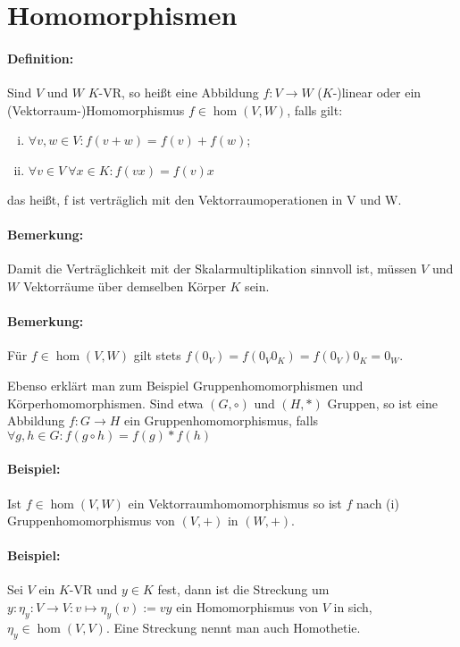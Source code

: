 \section{Homomorphismen}
\paragraph{Definition:}
	Sind $ V $ und $ W $ $ K $-VR, so heißt eine Abbildung $f: V \rightarrow W$ ($ K $-)linear oder ein (Vektorraum-)Homomorphismus $f\in \hom(V,W)$, falls gilt:

\begin{enumerate}[(i)]
	\item $\forall v,w \in V: f(v+w) = f(v) + f(w)$;
	\item $\forall v\in V\ \forall x\in K: f(vx) = f(v)x$
\end{enumerate}

    das heißt, f ist verträglich mit den Vektorraumoperationen in V und W.
    
\paragraph{Bemerkung:}
	Damit die Verträglichkeit mit der Skalarmultiplikation sinnvoll ist, müssen $ V $ und $ W $ Vektorräume über demselben Körper $ K $ sein.

\paragraph{Bemerkung:}
	Für $f\in \hom(V,W)$ gilt stets $f(0_V) = f(0_V0_K) = f(0_V)0_K = 0_W$.
  
  Ebenso erklärt man zum Beispiel Gruppenhomomorphismen und Körperhomomorphismen. Sind etwa $(G,\circ)$ und $(H,*)$ Gruppen, so ist eine Abbildung $f: G \to H$ ein Gruppenhomomorphismus, falls $\forall g,h \in G: f(g\circ h) = f(g) * f(h)$
  
\paragraph{Beispiel:}
	Ist $f\in \hom(V,W)$ ein Vektorraumhomomorphismus so ist $ f $ nach (i) Gruppenhomomorphismus von $ (V,+) $ in $ (W,+) $.
  
\paragraph{Beispiel:}
	Sei $ V $ ein $ K $-VR und $y\in K$ fest, dann ist die Streckung um $y: \eta_y:V\to V: v\mapsto \eta_y(v) := vy$ ein Homomorphismus von $ V $ in sich, $\eta_y\in \hom(V,V)$. Eine Streckung nennt man auch Homothetie.
  	

